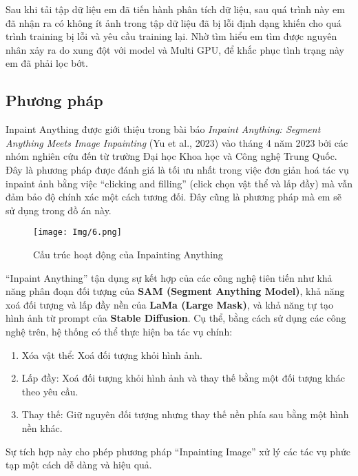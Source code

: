 \documentclass[12pt]{report}
\begin{document}
Sau khi tải tập dữ liệu em đã tiến hành phân tích dữ liệu, sau quá trình này em đã nhận ra có không ít ảnh trong tập dữ liệu đã bị lỗi định dạng khiến cho quá trình training bị lỗi và yêu cầu training lại. Nhờ tìm hiểu em tìm được nguyên nhân xảy ra do xung đột với model và Multi GPU, để khắc phục tình trạng này em đã phải lọc bớt.
\subsection{Phương pháp}

Inpaint Anything được giới thiệu trong bài báo \textit{Inpaint Anything: Segment Anything Meets Image Inpainting} (Yu et al., 2023) vào tháng 4 năm 2023 bởi các nhóm nghiên cứu đến từ trường Đại học Khoa học và Công nghệ Trung Quốc. Đây là phương pháp được đánh giá là tối ưu nhất trong việc đơn giản hoá tác vụ inpaint ảnh bằng việc “clicking and filling” (click chọn vật thể và lấp đầy) mà vẫn đảm bảo độ chính xác một cách tương đối. Đây cũng là phương pháp mà em sẽ sử dụng trong đồ án này.

\vspace{1em}
\begin{figure}[H]
    \centering
    \texttt{[image: Img/6.png]}
    \caption{Cấu trúc hoạt động của Inpainting Anything}
    \label{fig:6}
\end{figure}
\vspace{0.5em}

“Inpaint Anything” tận dụng sự kết hợp của các công nghệ tiên tiến như khả năng phân đoạn đối tượng của \textbf{SAM (Segment Anything Model)}, khả năng xoá đối tượng và lấp đầy nền của \textbf{LaMa (Large Mask)}, và khả năng tự tạo hình ảnh từ prompt của \textbf{Stable Diffusion}. Cụ thể, bằng cách sử dụng các công nghệ trên, hệ thống có thể thực hiện ba tác vụ chính:

\begin{enumerate}
    \item Xóa vật thể: Xoá đối tượng khỏi hình ảnh.
    \item Lấp đầy: Xoá đối tượng khỏi hình ảnh và thay thế bằng một đối tượng khác theo yêu cầu.
    \item Thay thế: Giữ nguyên đối tượng nhưng thay thế nền phía sau bằng một hình nền khác.
\end{enumerate}

Sự tích hợp này cho phép phương pháp “Inpainting Image” xử lý các tác vụ phức tạp một cách dễ dàng và hiệu quả.

\vspace{1em}
\end{document}
